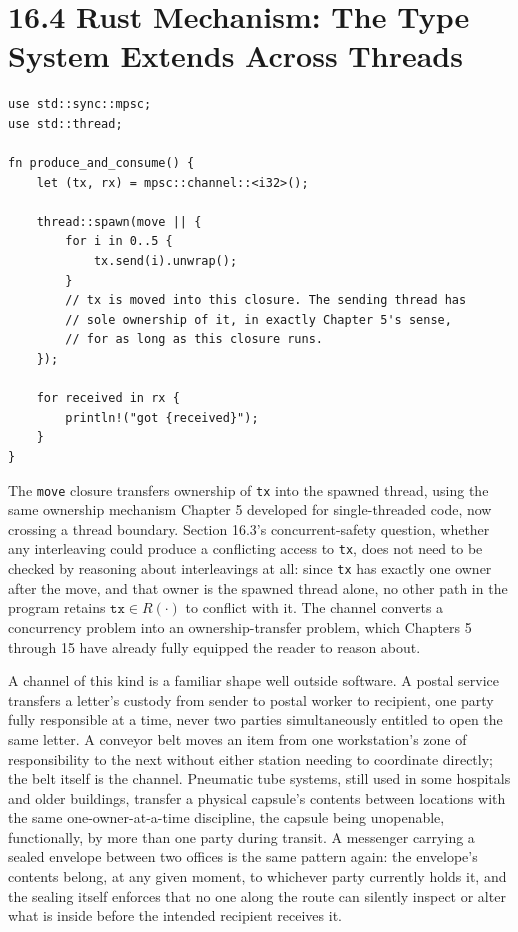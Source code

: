 \documentclass[11pt]{book}
\begin{document}
\section*{16.4 Rust Mechanism: The Type System Extends Across Threads}

\begin{lstlisting}
use std::sync::mpsc;
use std::thread;

fn produce_and_consume() {
    let (tx, rx) = mpsc::channel::<i32>();

    thread::spawn(move || {
        for i in 0..5 {
            tx.send(i).unwrap();
        }
        // tx is moved into this closure. The sending thread has
        // sole ownership of it, in exactly Chapter 5's sense,
        // for as long as this closure runs.
    });

    for received in rx {
        println!("got {received}");
    }
}
\end{lstlisting}

The \texttt{move} closure transfers ownership of \texttt{tx} into the spawned thread, using the same ownership mechanism Chapter 5 developed for single-threaded code, now crossing a thread boundary. Section 16.3's concurrent-safety question, whether any interleaving could produce a conflicting access to \texttt{tx}, does not need to be checked by reasoning about interleavings at all: since \texttt{tx} has exactly one owner after the move, and that owner is the spawned thread alone, no other path in the program retains $\texttt{tx} \in R(\cdot)$ to conflict with it. The channel converts a concurrency problem into an ownership-transfer problem, which Chapters 5 through 15 have already fully equipped the reader to reason about.

A channel of this kind is a familiar shape well outside software. A postal service transfers a letter's custody from sender to postal worker to recipient, one party fully responsible at a time, never two parties simultaneously entitled to open the same letter. A conveyor belt moves an item from one workstation's zone of responsibility to the next without either station needing to coordinate directly; the belt itself is the channel. Pneumatic tube systems, still used in some hospitals and older buildings, transfer a physical capsule's contents between locations with the same one-owner-at-a-time discipline, the capsule being unopenable, functionally, by more than one party during transit. A messenger carrying a sealed envelope between two offices is the same pattern again: the envelope's contents belong, at any given moment, to whichever party currently holds it, and the sealing itself enforces that no one along the route can silently inspect or alter what is inside before the intended recipient receives it.
\end{document}

